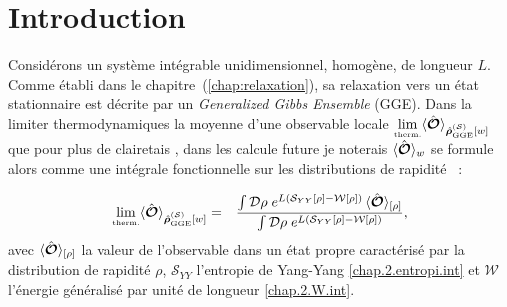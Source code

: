 \minitoc

\section*{Introduction}


Considérons un système intégrable unidimensionnel, homogène, de longueur \(L\). Comme établi dans le chapitre~(\ref{chap:relaxation}), sa relaxation vers un état stationnaire est décrite par un \textit{Generalized Gibbs Ensemble} (GGE). Dans la limiter thermodynamiques la moyenne d’une observable locale $\underset{\mbox{\tiny therm.}}{\lim}\langle \hat{\bm{\mathcal{O}}} \rangle_{\hat{\bm{\rho}}_{\mathrm{GGE}}^{(\mathcal{S})}[w]}$ que pour plus de clairetais , dans les calcule future je noterais \(\langle\hat{\bm{\mathcal{O}}}\rangle_w\) se formule alors comme une intégrale fonctionnelle sur les distributions de rapidité~\cite{YangYang1969} :

\begin{eqnarray}
	\underset{\mbox{\tiny therm.}}{\lim}\langle \hat{\bm{\mathcal{O}}} \rangle_{\hat{\bm{\rho}}_{\mathrm{GGE}}^{(\mathcal{S})}[w]} & = & \frac{\int \mathcal{D} \rho \; e^{L (\mathcal{S}_{YY}[\rho] - \mathcal{W}[\rho])} \, \langle\hat{\bm{\mathcal{O}}} \rangle_{[\rho]}}{\int \mathcal{D} \rho \; e^{L (\mathcal{S}_{YY}[\rho] - \mathcal{W}[\rho])}}, \label{chap:fluctu:eq:ensemble_average}
\end{eqnarray}
avec $\langle\hat{\bm{\mathcal{O}}} \rangle_{[\rho]}$ la valeur de l’observable dans un état propre caractérisé par la distribution de rapidité $\rho$, $\mathcal{S}_{YY}$ l'entropie de Yang-Yang \eqref{chap.2.entropi.int} et $\mathcal{W}$ l'énergie généralisé par unité de longueur \eqref{chap.2.W.int}.


